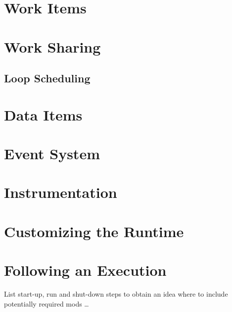 \section{Work Items}
\section{Work Sharing}
\subsection{Loop Scheduling}
\section{Data Items}
\section{Event System}
\section{Instrumentation}
\section{Customizing the Runtime}

\section{Following an Execution}
List start-up, run and shut-down steps to obtain an idea where to include
potentially required mods \ldots
